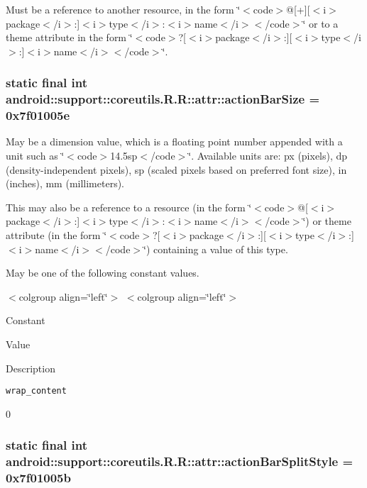 Must be a reference to another resource, in the form \char`\"{}$<$code$>$@\mbox{[}+\mbox{]}\mbox{[}$<$i$>$package$<$/i$>$:\mbox{]}$<$i$>$type$<$/i$>$:$<$i$>$name$<$/i$>$$<$/code$>$\char`\"{} or to a theme attribute in the form \char`\"{}$<$code$>$?\mbox{[}$<$i$>$package$<$/i$>$:\mbox{]}\mbox{[}$<$i$>$type$<$/i$>$:\mbox{]}$<$i$>$name$<$/i$>$$<$/code$>$\char`\"{}. \hypertarget{classandroid_1_1support_1_1coreutils_1_1_r_1_1attr_1126d86ef16810528e2fe2dba2e4d38a}{
\subsubsection[{actionBarSize}]{\setlength{\rightskip}{0pt plus 5cm}static final int android::support::coreutils.R.R::attr::actionBarSize = 0x7f01005e}}
\label{classandroid_1_1support_1_1coreutils_1_1_r_1_1attr_1126d86ef16810528e2fe2dba2e4d38a}


May be a dimension value, which is a floating point number appended with a unit such as \char`\"{}$<$code$>$14.5sp$<$/code$>$\char`\"{}. Available units are: px (pixels), dp (density-independent pixels), sp (scaled pixels based on preferred font size), in (inches), mm (millimeters). 

This may also be a reference to a resource (in the form \char`\"{}$<$code$>$@\mbox{[}$<$i$>$package$<$/i$>$:\mbox{]}$<$i$>$type$<$/i$>$:$<$i$>$name$<$/i$>$$<$/code$>$\char`\"{}) or theme attribute (in the form \char`\"{}$<$code$>$?\mbox{[}$<$i$>$package$<$/i$>$:\mbox{]}\mbox{[}$<$i$>$type$<$/i$>$:\mbox{]}$<$i$>$name$<$/i$>$$<$/code$>$\char`\"{}) containing a value of this type. 

May be one of the following constant values. \begin{TabularC}{0}
\hline
\end{TabularC}
$<$colgroup align=\char`\"{}left\char`\"{}$>$ $<$colgroup align=\char`\"{}left\char`\"{}$>$ 

Constant

Value

Description 

{\tt wrap\_\-content}

0\hypertarget{classandroid_1_1support_1_1coreutils_1_1_r_1_1attr_015c899e660368df80661750e1c4eb9d}{
\subsubsection[{actionBarSplitStyle}]{\setlength{\rightskip}{0pt plus 5cm}static final int android::support::coreutils.R.R::attr::actionBarSplitStyle = 0x7f01005b}}
\label{classandroid_1_1support_1_1coreutils_1_1_r_1_1attr_015c899e660368df80661750e1c4eb9d}


